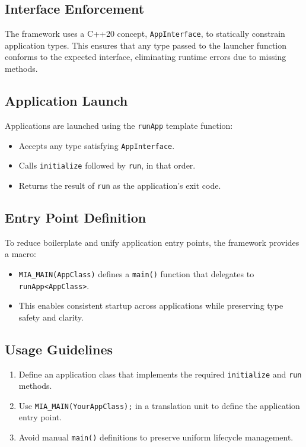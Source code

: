 \subsection*{Interface Enforcement}
The framework uses a C++20 concept, \texttt{AppInterface}, to statically constrain application types. This ensures that any type passed to the launcher function conforms to the expected interface, eliminating runtime errors due to missing methods.

\subsection*{Application Launch}
Applications are launched using the \texttt{runApp} template function:
\begin{itemize}
	\item Accepts any type satisfying \texttt{AppInterface}.
	\item Calls \texttt{initialize} followed by \texttt{run}, in that order.
	\item Returns the result of \texttt{run} as the application's exit code.
\end{itemize}

\subsection*{Entry Point Definition}
To reduce boilerplate and unify application entry points, the framework provides a macro:
\begin{itemize}
	\item \texttt{MIA\_MAIN(AppClass)} defines a \texttt{main()} function that delegates to \texttt{runApp<AppClass>}.
	\item This enables consistent startup across applications while preserving type safety and clarity.
\end{itemize}

\subsection*{Usage Guidelines}
\begin{enumerate}
	\item Define an application class that implements the required \texttt{initialize} and \texttt{run} methods.
	\item Use \texttt{MIA\_MAIN(YourAppClass);} in a translation unit to define the application entry point.
	\item Avoid manual \texttt{main()} definitions to preserve uniform lifecycle management.
\end{enumerate}

